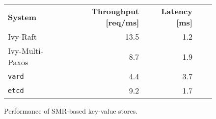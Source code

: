 \begin{figure}
  \begin{footnotesize}
  \begin{tabular}{lrrrr}
    \textbf{System} & \textbf{Throughput [req/ms]} & \textbf{Latency [ms]}\\
    Ivy-Raft        & 13.5       & 1.2 \\
    Ivy-Multi-Paxos & 8.7       & 1.9 \\
    \texttt{vard}   & 4.4      & 3.7 \\
    \texttt{etcd}   & 9.2        & 1.7 \\
  \end{tabular}
  \end{footnotesize}
  \caption{\label{tab:perf}%
  Performance of SMR-based key-value stores.
  }
\end{figure}
